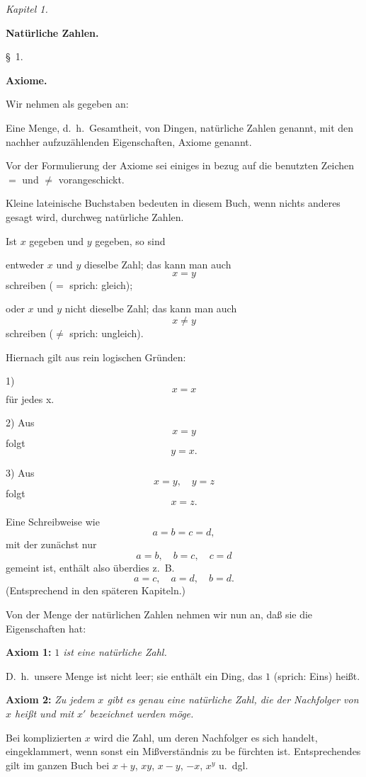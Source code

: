 
\line{}\baselineskip
\centerline{\sl Kapitel 1.}
\medskip

\centerline{\bf Nat\"urliche Zahlen.}
\bigskip

\centerline{{\S}~1.}
\medskip

\centerline{\bf Axiome.}
\bigskip

Wir nehmen als gegeben an:

Eine Menge, d.~h.\ Gesamtheit, von Dingen, nat\"urliche Zahlen
genannt, mit den nachher aufzuz\"ahlenden Eigenschaften, Axiome
genannt.

Vor der Formulierung der Axiome sei einiges in bezug auf
die benutzten Zeichen $=$ und $\ne$ vorangeschickt.

Kleine lateinische Buchstaben bedeuten in diesem Buch, wenn
nichts anderes gesagt wird, durchweg nat\"urliche Zahlen.

Ist $x$ gegeben und $y$ gegeben, so sind

entweder $x$ und $y$ dieselbe Zahl; das kann man auch
$$x = y$$
schreiben ($=$ sprich: gleich);

oder $x$ und $y$ nicht dieselbe Zahl; das kann man auch
$$x \ne y$$
schreiben ($\ne$ sprich: ungleich).

Hiernach gilt aus rein logischen Gr\"unden:

1)
$$x = x$$
f\"ur jedes x.

2) Aus
$$x = y$$
folgt
$$y = x.$$

3) Aus
$$x = y,\quad y = z$$
folgt
$$x = z.$$

Eine Schreibweise wie
$$a = b = c = d,$$
mit der zun\"achst nur
$$a = b,\quad b = c,\quad c = d$$
gemeint ist, enth\"alt also \"uberdies z.~B.\ %
$$a = c,\quad a = d,\quad b = d.$$
(Entsprechend in den sp\"ateren Kapiteln.)

Von der Menge der nat\"urlichen Zahlen nehmen wir nun an,
da{\ss} sie die Eigenschaften hat:
\medskip

{\bf Axiom 1:} {\it $1$ ist eine nat\"urliche Zahl.}

D.~h.\ unsere Menge ist nicht leer; sie enth\"alt ein Ding, das $1$
(sprich: Eins) hei{\ss}t.
\medskip


{\bf Axiom 2:} {\it Zu jedem $x$ gibt es genau eine nat\"urliche Zahl, die
der Nachfolger von $x$ hei{\ss}t und mit $x'$ bezeichnet uerden m\"oge.}

Bei komplizierten $x$ wird die Zahl, um deren Nachfolger es
sich handelt, eingeklammert, wenn sonst ein Mi{\ss}verst\"andnis zu be%
f\"urchten ist.  Entsprechendes gilt im ganzen Buch bei $x + y$, $xy$,
$x - y$, $- x$, $x^y$ u.~dgl.

